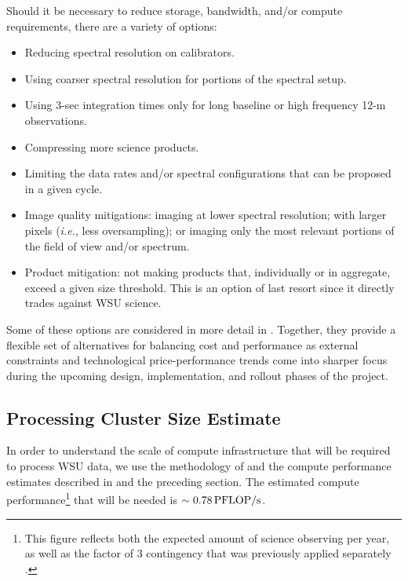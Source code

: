 Should it be necessary to reduce storage, bandwidth, and/or compute requirements, there are a variety of options:
\begin{itemize}[itemsep=-0.5em]
    \item Reducing spectral resolution on calibrators.
    \item Using coarser spectral resolution for portions of the spectral setup.
    \item Using 3-sec integration times only for long baseline or high frequency 12-m observations.
    \item Compressing more science products.
    \item Limiting the data rates and/or spectral configurations that can be proposed in a given cycle.
    \item Image quality mitigations: imaging at lower spectral resolution; with larger pixels ({\it i.e.}, less oversampling); or imaging only the most relevant portions of the field of view and/or spectrum.
    \item Product mitigation: not making products that, individually or in aggregate, exceed a given size threshold. This is an option of last resort since it directly trades against WSU science.
\end{itemize}
Some of these options are considered in more detail in 
\cite{drru_mean}. Together, they provide a flexible set of
alternatives for balancing cost and performance as external
constraints and technological price-performance trends come
into sharper focus during the upcoming design,
implementation, and rollout phases of the project.





\subsection{Processing  Cluster Size Estimate}
\label{sec:clusterSize}

In order to understand the scale of compute infrastructure that will be required to process WSU data, we use the methodology of \cite{computeCostTsi} and the compute performance estimates described in \cite{dpSizeOfCompute} and the preceding section. The estimated compute performance\footnote{This figure reflects both the expected amount of science observing per year, as well as the factor of 3 contingency that was previously applied separately \cite{computeCostTsi}.} that will be needed is $\sim 0.78 \, {\rm PFLOP/s}$.


